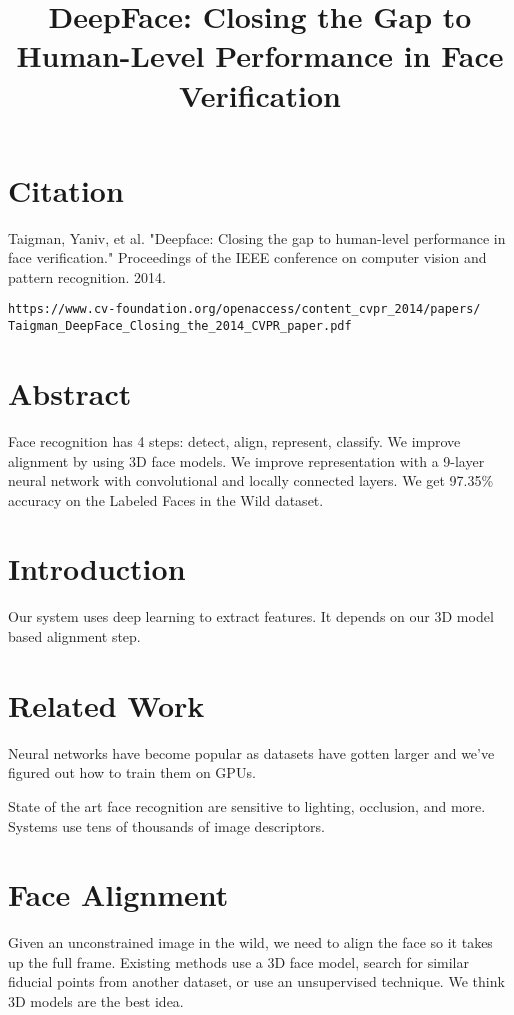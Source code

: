 \documentclass[a4paper]{article}
\title{DeepFace: Closing the Gap to Human-Level Performance in Face 
Verification}
\date{}
\begin{document}
\maketitle

\section{Citation}
Taigman, Yaniv, et al. "Deepface: Closing the gap to human-level performance in face verification." Proceedings of the IEEE conference on computer vision and pattern recognition. 2014.

\begin{verbatim}
https://www.cv-foundation.org/openaccess/content_cvpr_2014/papers/
Taigman_DeepFace_Closing_the_2014_CVPR_paper.pdf
\end{verbatim}

\section{Abstract}
Face recognition has 4 steps: detect, align, represent, classify. We improve
alignment by using 3D face models. We improve representation with a 9-layer
neural network with convolutional and locally connected layers. We get 97.35\%
accuracy on the Labeled Faces in the Wild dataset.

\section{Introduction}
Our system uses deep learning to extract features. It depends on our 3D model
based alignment step.

\section{Related Work}
Neural networks have become popular as datasets have gotten larger and we've
figured out how to train them on GPUs.

State of the art face recognition are sensitive to lighting, occlusion, and
more. Systems use tens of thousands of image descriptors.

\section{Face Alignment}
Given an unconstrained image in the wild, we need to align the face so it takes
up the full frame. Existing methods use a 3D face model, search for similar
fiducial points from another dataset, or use an unsupervised technique. We
think 3D models are the best idea.
\end{document}
